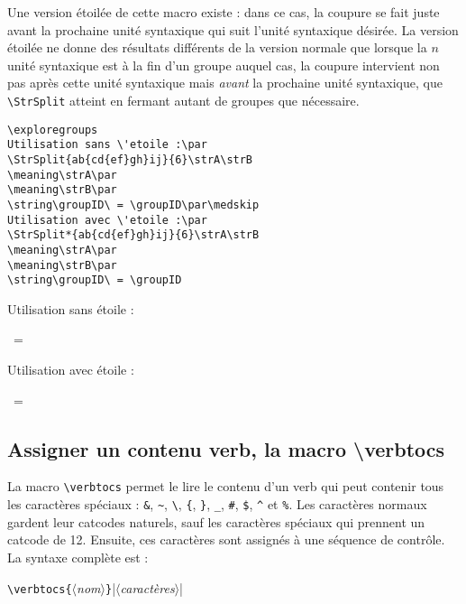 \documentclass[a4paper,10pt]{article}
\newcommand\guill[1]{\og{}#1\fg{}}
\newcommand\argu[1]{$\langle$\textit{#1}$\rangle$}
\newcommand\ARGU[1]{\texttt{\color{black}\{}\argu{#1}\texttt{\color{black}\}}}
\newcommand\US{unité syntaxique\xspace}
\newcommand\styleexercice{\footnotesize}
\newcommand\verbinline{\lstinline[basicstyle=\normalsize\ttfamily]}
\begin{document}
Une version étoilée de cette macro existe : dans ce cas, la coupure se fait juste avant la prochaine \US qui suit l'\US désirée. La version étoilée ne donne des résultats différents de la version normale que lorsque la $n$\ieme{} \US est à la fin d'un groupe auquel cas, la coupure intervient non pas après cette \US mais \emph{avant} la prochaine \US, que \verbinline|\StrSplit| atteint en fermant autant de groupes que nécessaire.\smallskip

\begin{minipage}[c]{0.65\linewidth}
\hfill
\begin{lstlisting}
\exploregroups
Utilisation sans \'etoile :\par
\StrSplit{ab{cd{ef}gh}ij}{6}\strA\strB
\meaning\strA\par
\meaning\strB\par
\string\groupID\ = \groupID\par\medskip
Utilisation avec \'etoile :\par
\StrSplit*{ab{cd{ef}gh}ij}{6}\strA\strB
\meaning\strA\par
\meaning\strB\par
\string\groupID\ = \groupID
\end{lstlisting}%
\end{minipage}\hfill
\begin{minipage}[c]{0.35\linewidth}
	\styleexercice
	\exploregroups
	Utilisation sans étoile :\par
	\strA\strB
	\meaning\strA\par
	\meaning\strB\par
	\string\groupID\ = \groupID\par\medskip
	Utilisation avec \'etoile :\par
	\strA\strB
	\meaning\strA\par
	\meaning\strB\par
	\string\groupID\ = \groupID
\end{minipage}%

\subsection{Assigner un contenu verb, la macro \ttfamily\textbackslash verbtocs}
\label{verbtocs}
La macro \verbinline|\verbtocs| permet le lire le contenu d'un \guill{verb} qui peut contenir tous les caractères spéciaux : \verb|&|, \verb|~|, \verb|\|, \verb|{|, \verb|}|, \verb|_|, \verb|#|, \verb|$|, \verb|^| et \verb|%|. Les caractères \guill{normaux} gardent leur catcodes naturels, sauf les caractères spéciaux qui prennent un catcode de 12. Ensuite, ces caractères sont assignés à une séquence de contrôle. La syntaxe complète est :\par\nobreak\medskip
\hfill\verbinline|\verbtocs|\ARGU{nom}|\argu{caractères}|\hfill{}
\smallskip
\end{document}
